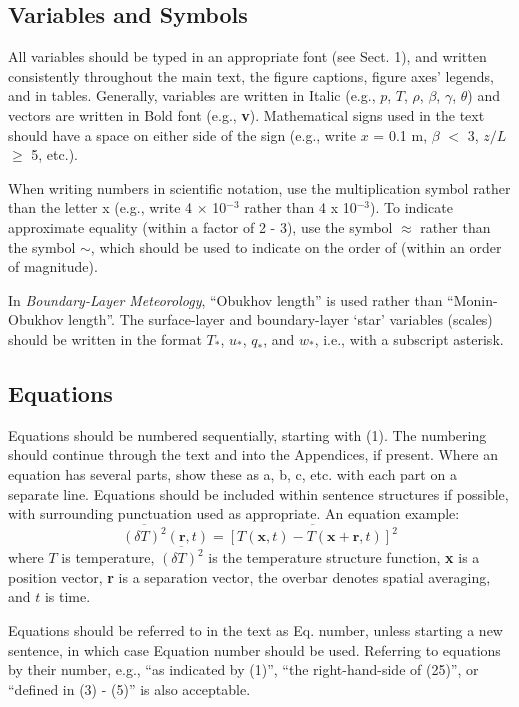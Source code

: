 \subsection{Variables and Symbols}
All variables should be typed in an appropriate font (see Sect. 1), and written consistently throughout the main text, the figure captions, figure axes' legends, and in tables. Generally, variables are written in Italic (e.g., $p$, $T$, $\rho$, $\beta$, $\gamma$, $\theta$) and vectors are written in Bold font (e.g., \textbf{v}). Mathematical signs used in the text should have a space on either side of the sign (e.g., write $x$ = 0.1 m, $\beta$ $<$ 3, $z/L$ $\geq$ 5, etc.).

When writing numbers in scientific notation, use the multiplication symbol rather than the letter x (e.g., write 4 $\times$ 10$^{-3}$ rather than 4 x 10$^{-3}$). To indicate approximate equality (within a factor of 2 - 3), use the symbol $\approx$ rather than the symbol $\sim$, which should be used to indicate on the order of (within an order of magnitude).

In \textit{Boundary-Layer Meteorology}, ``Obukhov length'' is used rather than ``Monin-Obukhov length''. The surface-layer and boundary-layer `star' variables (scales) should be written in the format $T_*$, $u_*$, $q_*$, and $w_*$, i.e., with a subscript asterisk.

\subsection{Equations}
Equations should be numbered sequentially, starting with (1). The numbering should continue through the text and into the Appendices, if present. Where an equation has several parts, show these as a, b, c, etc. with each part on a separate line. Equations should be included within sentence structures if possible, with surrounding punctuation used as appropriate. An equation example:
\begin{equation}
\overline{(\delta{T})^2}(\textbf{r},t)=\overline{[T(\textbf{x},t)-T(\textbf{x}+\textbf{r},t)]^2}
\end{equation}
where $T$ is temperature, $\overline{(\delta{T})^2}$ is the temperature structure function, \textbf{x}  is a position vector, \textbf{r} is a separation vector, the overbar denotes spatial averaging, and $t$ is time.

Equations should be referred to in the text as Eq. number, unless starting a new sentence, in which case Equation number should be used. Referring to equations by their number, e.g., ``as indicated by (1)'', ``the right-hand-side of (25)'', or ``defined in (3) - (5)'' is also acceptable.  

